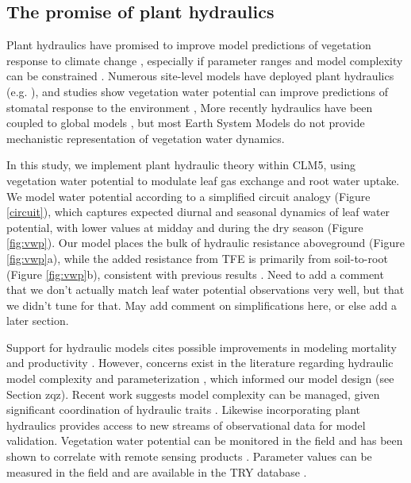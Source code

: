 \documentclass[draft,linenumbers]{agujournal}
\begin{document}
\subsection{The promise of plant hydraulics}
    Plant hydraulics have promised to improve model predictions of vegetation response to climate change \citep{sperry2015}, 
    especially if parameter ranges and model complexity can be constrained \citep{rogers2017}.
    Numerous site-level models have deployed plant hydraulics (e.g. \citet{williams1996,sperry1998,bohrer2005}), and studies show
    vegetation water potential can improve predictions of stomatal response to the environment \citep{sperry2017,anderegg2017},
    More recently hydraulics have been coupled to global models \citep{bonan2014,xu2016,christoffersen2016}, 
    but most Earth System Models do not provide mechanistic representation of vegetation water dynamics.

    In this study, we implement plant hydraulic theory within CLM5, 
    using vegetation water potential to modulate leaf gas exchange and root water uptake.
    We model water potential according to a simplified circuit analogy (Figure \ref{circuit}), 
    which captures expected diurnal and seasonal dynamics of leaf water potential, with lower values at midday and during the dry season (Figure \ref{fig:vwp}).
    Our model places the bulk of hydraulic resistance aboveground (Figure \ref{fig:vwp}a), 
    while the added resistance from TFE is primarily from soil-to-root (Figure \ref{fig:vwp}b), consistent with previous results \citep{fisher2006}.
    Need to add a comment that we don't actually match leaf water potential observations very well, but that we didn't tune for that.
    May add comment on simplifications here, or else add a later section.

    Support for hydraulic models cites possible improvements in modeling mortality and productivity \citep{mcdowell2018,choat2012}.
    However, concerns exist in the literature regarding hydraulic model complexity and parameterization \citep{verhoef2014,drake2017}, 
    which informed our model design (see Section zqz).
    Recent work suggests model complexity can be managed, given significant coordination of hydraulic traits \citep{bartlett2016,christoffersen2016}.
    Likewise incorporating plant hydraulics provides access to new streams of observational data for model validation.
    Vegetation water potential can be monitored in the field \citep{boyer1967} and has been shown to correlate with remote sensing products \citep{momen2017}.
    Parameter values can be measured in the field \citep{sack2002} and are available in the TRY database \citep{kattge2011}.
\end{document}
